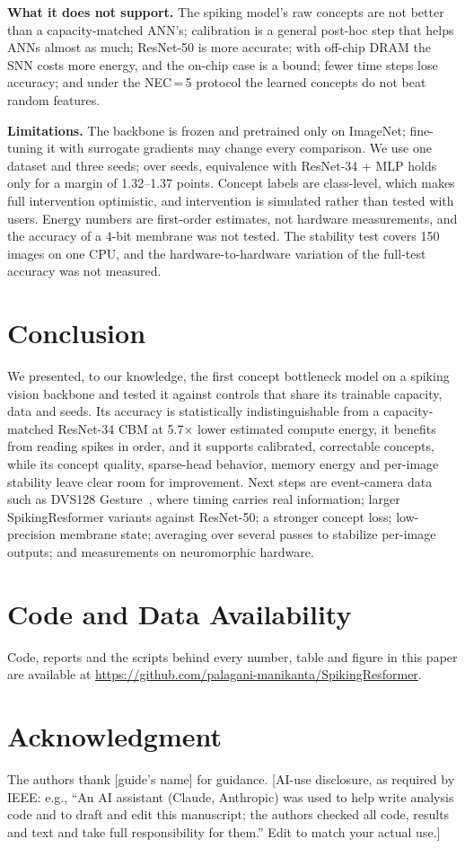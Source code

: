 \documentclass[conference]{IEEEtran}
\begin{document}
\textbf{What it does not support.} The spiking model's raw concepts are not better than a capacity-matched ANN's; calibration is a general post-hoc step that helps ANNs almost as much; ResNet-50 is more accurate; with off-chip DRAM the SNN costs more energy, and the on-chip case is a bound; fewer time steps lose accuracy; and under the NEC\,=\,5 protocol the learned concepts do not beat random features.

\textbf{Limitations.} The backbone is frozen and pretrained only on ImageNet; fine-tuning it with surrogate gradients may change every comparison. We use one dataset and three seeds; over seeds, equivalence with ResNet-34 + MLP holds only for a margin of 1.32--1.37 points. Concept labels are class-level, which makes full intervention optimistic, and intervention is simulated rather than tested with users. Energy numbers are first-order estimates, not hardware measurements, and the accuracy of a 4-bit membrane was not tested. The stability test covers 150 images on one CPU, and the hardware-to-hardware variation of the full-test accuracy was not measured.

\section{Conclusion}
We presented, to our knowledge, the first concept bottleneck model on a spiking vision backbone and tested it against controls that share its trainable capacity, data and seeds. Its accuracy is statistically indistinguishable from a capacity-matched ResNet-34 CBM at 5.7$\times$ lower estimated compute energy, it benefits from reading spikes in order, and it supports calibrated, correctable concepts, while its concept quality, sparse-head behavior, memory energy and per-image stability leave clear room for improvement. Next steps are event-camera data such as DVS128 Gesture~\cite{amir2017low}, where timing carries real information; larger SpikingResformer variants against ResNet-50; a stronger concept loss; low-precision membrane state; averaging over several passes to stabilize per-image outputs; and measurements on neuromorphic hardware.

\section*{Code and Data Availability}
Code, reports and the scripts behind every number, table and figure in this paper are available at \url{https://github.com/palagani-manikanta/SpikingResformer}.

\section*{Acknowledgment}
The authors thank [guide's name] for guidance. [AI-use disclosure, as required by IEEE: e.g., ``An AI assistant (Claude, Anthropic) was used to help write analysis code and to draft and edit this manuscript; the authors checked all code, results and text and take full responsibility for them.'' Edit to match your actual use.]



\end{document}
